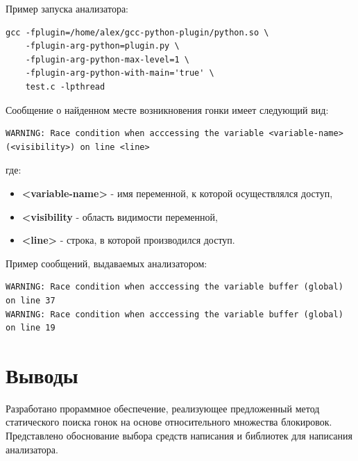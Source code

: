 Пример запуска анализатора:
\begin{verbatim}
gcc -fplugin=/home/alex/gcc-python-plugin/python.so \
    -fplugin-arg-python=plugin.py \
    -fplugin-arg-python-max-level=1 \
    -fplugin-arg-python-with-main='true' \
    test.c -lpthread
\end{verbatim}

Сообщение о найденном месте возникновения гонки имеет следующий вид:
\begin{verbatim}
WARNING: Race condition when acccessing the variable <variable-name> (<visibility>) on line <line>
\end{verbatim}
где:
\begin{itemize}
  \item \textbf{<variable-name>} - имя переменной, к которой осуществлялся доступ,
  \item \textbf{<visibility} - область видимости переменной,
  \item \textbf{<line>} - строка, в которой производился доступ.
\end{itemize}

Пример сообщений, выдаваемых анализатором:
\begin{verbatim}
WARNING: Race condition when acccessing the variable buffer (global) on line 37
WARNING: Race condition when acccessing the variable buffer (global) on line 19
\end{verbatim}

\section{Выводы}

Разработано прораммное обеспечение, реализующее предложенный метод статического поиска гонок на основе относительного множества блокировок. Представлено обоснование выбора средств написания и библиотек для написания анализатора.

